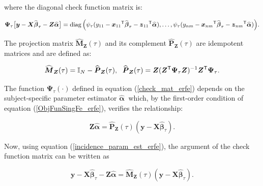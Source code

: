 \documentclass[15pt,a4paper]{article}
\DeclareMathOperator{\diag}{diag}
\newcommand{\transpose}{{}^{\text{\sffamily T}}}
\begin{document}
where the diagonal check function matrix is:

\begin{equation}\label{check_mat_erfe}
   \boldsymbol{\Psi}_{\tau}\big[\boldsymbol{y}-\boldsymbol{X}\widehat{\boldsymbol{\beta}}_{\tau}- \boldsymbol{Z}\widehat{\boldsymbol{\alpha}}\big]=
  \diag\Big(\psi_{\tau}(y_{11}-\boldsymbol{x}_{11}\transpose\widehat{\boldsymbol{\beta}}_{\tau}- 
   \boldsymbol{z}_{11}\transpose\widehat{\boldsymbol{\alpha}}),\ldots, \psi_{\tau}(y_{nm}-\boldsymbol{x}_{nm}\transpose\widehat{\boldsymbol{\beta}}_{\tau}- 
   \boldsymbol{z}_{nm}\transpose\widehat{\boldsymbol{\alpha}})\Big).
\end{equation}

The projection matrix \(\widehat{\boldsymbol{M}}_{\boldsymbol{Z}}(\tau)\) and its complement \(\widehat{\boldsymbol{P}}_{\boldsymbol{Z}}(\tau)\) are idempotent matrices and are defined as:

\begin{equation*}
\widehat{\boldsymbol{M}}_{\boldsymbol{Z}}(\tau)=\mathbb{I}_{N}-\widehat{\boldsymbol{P}}_{\boldsymbol{Z}}(\tau), \; \
\widehat{\boldsymbol{P}}_{\boldsymbol{Z}}(\tau)=\boldsymbol{Z}(\boldsymbol{Z}\transpose
\boldsymbol{\Psi}_{\tau}\boldsymbol{Z})^{-1}\boldsymbol{Z}\transpose\boldsymbol{\Psi}_{\tau}.
\end{equation*}

The function \(\boldsymbol{\Psi}_{\tau}(\cdot)\) defined in equation (\ref{check_mat_erfe}) depends on the subject-specific parameter estimator \(\widehat{\boldsymbol{\alpha}}\ \) which, by the first-order condition of equation (\ref{ObjFunSingFe_erfe}), verifies the relationship:

\begin{equation}\label{incidence_param_est_erfe}
   \boldsymbol{Z}\widehat{\boldsymbol{\alpha}}=\widehat{\boldsymbol{P}}_{\boldsymbol{Z}}(\tau)(\boldsymbol{y}-\boldsymbol{X}\widehat{\boldsymbol
   {\beta}}_{\tau}).
\end{equation}

Now, using equation (\ref{incidence_param_est_erfe}), the argument of the check function matrix can be written as

\begin{equation}\label{new_u_erfe}
\boldsymbol{y}-\boldsymbol{X}\widehat{\boldsymbol{\beta}}_{\tau}- \boldsymbol{Z}\widehat{\boldsymbol{\alpha}}=
\widehat{\boldsymbol{M}}_{\boldsymbol{Z}}(\tau)(\boldsymbol{y}-\boldsymbol{X}\widehat{\boldsymbol{\beta}}_{\tau}).
\end{equation}
\end{document}
